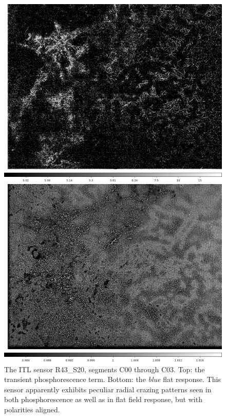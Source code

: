 \begin{figure}[!htbp]
\centering
\begin{minipage}{1.0\textwidth}    
  \centering
  \includegraphics[width=.6\linewidth]{sections/figures/phosphorescence-survey/stains_phos_R43_S20_detail.png}    
\end{minipage}
\begin{minipage}{1.0\textwidth}
  \centering
  \includegraphics[width=.6\linewidth]{sections/figures/phosphorescence-survey/stains_abs_R43_S20_detail.png}
\end{minipage}
\caption{The ITL sensor R43\_S20, segments C00 through C03. Top: the transient phosphorescence term. Bottom: the {\it blue} flat response. This sensor apparently exhibits peculiar radial crazing patterns seen in both phosphorescence as well as in flat field response, but with polarities aligned.}
\label{fig:phos:stains:R43S20}
\end{figure}
